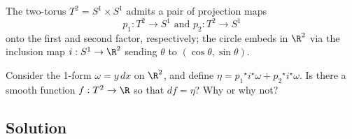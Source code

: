\documentclass[12pt]{quiz}
\begin{document}
\maketitle

\noindent
The two-torus $T^2 = S^1 \times S^1$ admits a pair of projection maps
$$
p_1 : T^2 \to S^1 \mbox{ and } p_2 : T^2 \to S^1
$$
onto the first and second factor, respectively; the circle embeds in
$\R^2$ via the inclusion map $i : S^1 \to \R^2$ sending $\theta$ to
$(\cos \theta, \sin \theta)$.

Consider the 1-form $\omega = y \, dx$ on $\R^2$, and define $\eta =
{p_1}^\star i^\star \omega + {p_2}^\star i^\star \omega$.  Is there a
smooth function $f : T^2 \to \R$ so that $df = \eta$?  Why or why not?



\subsection*{Solution}

\pagebreak
\null

\end{document}
